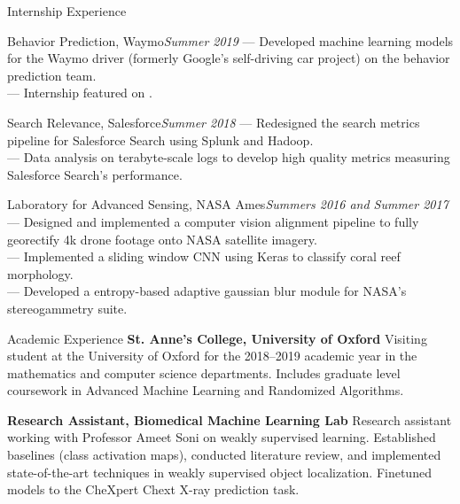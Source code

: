 \documentclass{resume} %
\begin{document}
\begin{rSection}{Internship Experience}
	{
		\begin{rSubsection}{Behavior Prediction,  Waymo}{\em Summer 2019}{}{}
			--- Developed machine learning models for the Waymo driver (formerly Google's self-driving car project) on the behavior prediction team. \\
			--- Internship featured on \href{https://blog.waymo.com/2019/12/from-hosted-to-host-internship.html}{}.
		\end{rSubsection}
	}
	{
		\begin{rSubsection}{Search Relevance, Salesforce}{\em Summer 2018}{}{}
			--- Redesigned the search metrics pipeline for Salesforce Search using Splunk and Hadoop. \\
			--- Data analysis on terabyte-scale logs to develop high quality metrics measuring Salesforce Search's performance.
		\end{rSubsection}
	}
	{
		\begin{rSubsection}{Laboratory for Advanced Sensing, NASA Ames}{\em Summers 2016 and Summer 2017}{}{}
			--- Designed and implemented a computer vision alignment pipeline to fully georectify 4k drone footage onto NASA satellite imagery. \\
			--- Implemented a sliding window CNN using Keras to classify coral reef morphology. \\
			--- Developed a entropy-based adaptive gaussian blur module for NASA's stereogammetry suite.
		\end{rSubsection}
	}

\end{rSection}  %

\begin{rSection}{Academic Experience}
	{\textbf{St. Anne's College, University of Oxford} Visiting student at the University of Oxford for the 2018--2019 academic year in the mathematics and computer science departments. Includes graduate level coursework in Advanced Machine Learning and Randomized Algorithms.}

	{\textbf{Research Assistant, Biomedical Machine Learning Lab} Research assistant working with Professor Ameet Soni on weakly supervised learning. Established baselines (class activation maps), conducted literature review, and implemented state-of-the-art techniques in weakly supervised object localization. Finetuned models to the CheXpert Chext X-ray prediction task.}
\end{rSection}  %
\end{document}
